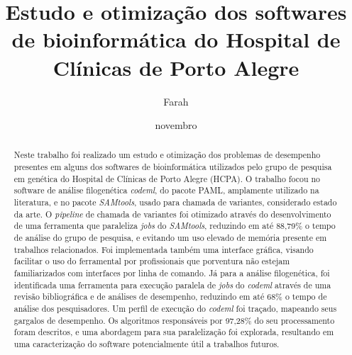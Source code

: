 \documentclass[cic,tc]{iiufrgs}
\title{Estudo e otimização dos softwares de bioinformática do Hospital de
Clínicas de Porto Alegre}
\author{Farah}{Alef}
\date{novembro}{2021}
\begin{document}
\maketitle



\begin{abstract}
  Neste trabalho foi realizado um estudo e otimização dos problemas de
  desempenho presentes em alguns dos softwares de bioinformática
  utilizados pelo grupo de pesquisa em genética do Hospital de Clínicas de
  Porto Alegre (HCPA). O trabalho focou no software de análise
  filogenética \textit{codeml}, do pacote PAML, amplamente utilizado na literatura, e no
  pacote \textit{SAMtools}, usado para chamada de variantes, considerado estado da arte.
  O \textit{pipeline} de chamada de variantes foi otimizado através do
  desenvolvimento de uma ferramenta que paraleliza \textit{jobs} do
  \textit{SAMtools}, reduzindo em até 88,79\% o tempo de análise do grupo de
  pesquisa, e evitando um uso elevado de memória presente em trabalhos
  relacionados. Foi implementada também uma interface gráfica, visando
  facilitar o uso do ferramental por profissionais que porventura não estejam
  familiarizados com interfaces por linha de comando.
  Já para a análise filogenética, foi identificada uma ferramenta para execução paralela de
  \textit{jobs} do \textit{codeml} através de uma revisão bibliográfica e de análises de
  desempenho, reduzindo em até 68\% o tempo de análise dos pesquisadores. Um
  perfil de execução do \textit{codeml} foi traçado, mapeando seus gargalos de
  desempenho. Os algoritmos responsáveis por 97,28\% do seu processamento foram
  descritos, e uma abordagem para sua paralelização foi explorada, resultando
  em uma caracterização do software potencialmente útil a trabalhos futuros.
\end{abstract}
\end{document}
